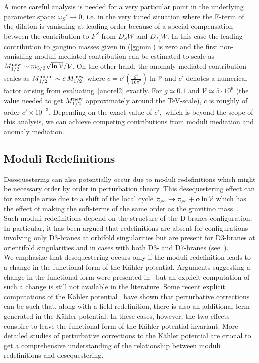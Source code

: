 \documentclass[12pt,a4paper]{book}
\def\SM{{\scriptscriptstyle \rm SM}}
\begin{document}
A more careful analysis is needed for a very particular point in the underlying parameter space:
$\omega_S' \to 0$, i.e. in the very tuned situation where the F-term of the dilaton is vanishing at leading order because of a special compensation between the contribution to $F^S$ from $D_S W$ and $D_{T_b} W$. In this case the leading contribution to gaugino masses given in (\ref{ggmm}) is zero and the first non-vanishing moduli mediated contribution can be estimated to scale as $M_{1/2}^{\rm new}\sim m_{3/2} \sqrt{\ln\mathcal{V}}/\mathcal{V} $. On the other hand, the anomaly mediated contribution scales as $M_{1/2}^{\rm anom}\sim c \,M_{1/2}^{\rm new}$ where $c = c' \left(\frac{g^2}{16\pi^2}\right) \ln\mathcal{V}$ and $c'$ denotes a numerical factor arising from evaluating~\eqref{anorel2} exactly. For $g\simeq 0.1$ and $\mathcal{V} \simeq 5\cdot 10^6$ (the value needed to get $M_{1/2}^{\rm new}$ approximately around the TeV-scale), $c$ is roughly of order $c'\times10^{-3}.$ Depending on the exact value of $c',$ which is beyond the scope of this analysis, we can achieve competing contributions from moduli mediation and anomaly mediation.

\subsection{Moduli Redefinitions}

Desequestering can also potentially occur due to moduli redefinitions which might be necessary order by order in perturbation theory. This desequestering effect can for example arise due to a shift of the local cycle $\tau_\SM\rightarrow \tau_\SM+\alpha\ln\mathcal{V}$ which has the effect of making the soft-terms of the same order as the gravitino mass~\cite{Conlon:2010ji,Choi:2010gm}.\\

Such moduli redefinitions depend on the structure of the D-branes configuration. In particular, it has been argued that redefinitions are absent for configurations involving only D3-branes at orbifold singularities but are present for D3-branes at orientifold singularities and in cases with both D3- and D7-branes (see~\cite{Conlon:2010ji}).\\

We emphasize that desequestering occurs only if the moduli redefinition leads to a change in the functional form of the K\"ahler potential. Arguments suggesting a change in the functional form were presented in~\cite{Conlon:2010ji} but an explicit computation of such a change is still not available in the literature. Some recent explicit computations of the K\"ahler potential~\cite{Grimm:2013bha, Junghans:2014zla} have shown that perturbative corrections can be such that, along with a field redefinition, there is also an additional term generated in the K\"ahler potential. In these cases, however, the two effects conspire to leave the functional form of the K\"ahler potential invariant. More detailed studies of perturbative corrections to the K\"ahler potential are crucial to get a comprehensive understanding  of the relationship between moduli redefinitions and desequestering.
\end{document}
